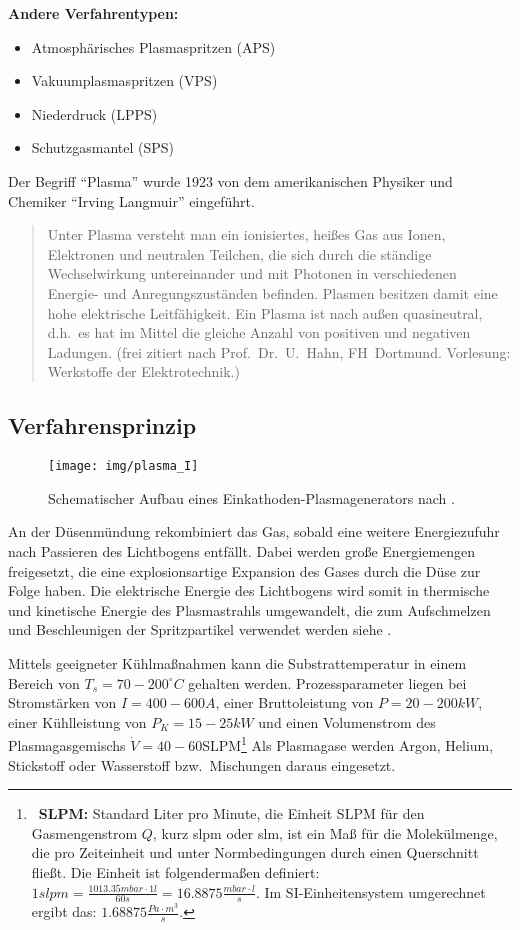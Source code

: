 \documentclass[12pt,a4paper,bibliography=totocnumbered,listof=totocnumbered,fleqn]{scrartcl}
\newenvironment{myquote}{\begin{quote} \small}{\end{quote}}
\begin{document}
\textbf{Andere Verfahrentypen:}
\begin{itemize}
	\item Atmosphärisches Plasmaspritzen (APS)
	\item Vakuumplasmaspritzen (VPS)
	\item Niederdruck (LPPS)
	\item Schutzgasmantel (SPS)
\end{itemize}

Der Begriff \enquote{Plasma} wurde 1923 von dem amerikanischen Physiker und Chemiker \enquote{Irving Langmuir} eingeführt.

\begin{myquote}
Unter Plasma versteht man ein ionisiertes, heißes Gas aus Ionen, Elektronen und neutralen Teilchen, die sich durch die ständige Wechselwirkung untereinander und mit Photonen in verschiedenen Energie- und Anregungszuständen befinden. Plasmen besitzen damit eine hohe elektrische Leitfähigkeit. Ein Plasma ist nach außen quasineutral, d.h.\ es hat im Mittel die gleiche Anzahl von positiven und negativen Ladungen. (frei zitiert nach Prof.~Dr.~U.~Hahn, FH~Dortmund. Vorlesung: Werkstoffe der Elektrotechnik.)
\end{myquote}
\pagebreak

\subsection{Verfahrensprinzip}

\begin{figure}[h]
\centering
\texttt{[image: img/plasma\_I]}
\caption{Schematischer Aufbau eines Einkathoden-Plasmagenerators nach \citep{bobzin2013oberflchentechnik}.}
\label{fig:plasmaprinzip}
\end{figure}

An der Düsenmündung rekombiniert das Gas, sobald eine weitere Energiezufuhr nach Passieren des Lichtbogens entfällt.
Dabei werden große Energiemengen freigesetzt, die eine explosionsartige Expansion des Gases durch die Düse zur Folge haben.
Die elektrische Energie des Lichtbogens wird somit in thermische und kinetische Energie des Plasmastrahls umgewandelt, die zum Aufschmelzen und Beschleunigen der Spritzpartikel verwendet werden siehe \citep{thermal2008}.

Mittels geeigneter Kühlmaßnahmen kann die Substrattemperatur in einem Bereich von $T_{s}=70-200^\circ C$ gehalten werden.
Prozessparameter liegen bei Stromstärken von $I=400-600A$, einer Bruttoleistung von $P=20-200kW$, einer Kühlleistung von $P_{K}=15-25kW$ und einen Volumenstrom des Plasmagasgemischs $\dot{V}=40-60$SLPM\footnote{~\textbf{SLPM:} Standard Liter pro Minute, die Einheit SLPM für den Gasmengenstrom $Q$, kurz slpm oder slm, ist ein Maß für die Molekülmenge, die pro Zeiteinheit und unter Normbedingungen durch einen Querschnitt fließt. Die Einheit ist folgendermaßen definiert: $1 slpm = \frac{1013.35 mbar \cdot 1l}{60s} = 16.8875 \frac{mbar\cdot l}{s}$. Im SI-Einheitensystem umgerechnet ergibt das: $1.68875 \frac{Pa\cdot m^{3}}{s}$.}
Als Plasmagase werden Argon, Helium, Stickstoff oder Wasserstoff bzw.\ Mischungen daraus eingesetzt.
\end{document}
